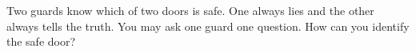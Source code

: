 Two guards know which of two doors is safe. One always lies and the other always tells the truth. You may ask one guard one question. How can you identify the safe door?
